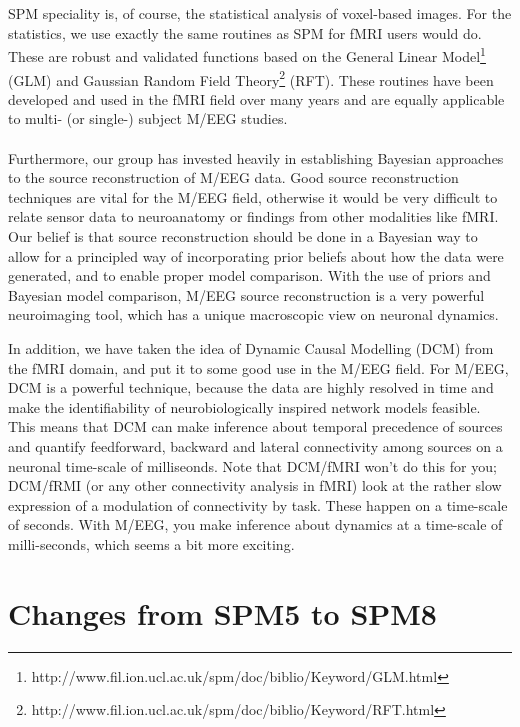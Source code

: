\\
\\
SPM speciality is, of course, the statistical analysis of voxel-based images. For the statistics, we use exactly the same routines as SPM for fMRI users would do. These are robust and validated functions based on the General Linear Model\footnote{http://www.fil.ion.ucl.ac.uk/spm/doc/biblio/Keyword/GLM.html} (GLM) and Gaussian Random Field Theory\footnote{http://www.fil.ion.ucl.ac.uk/spm/doc/biblio/Keyword/RFT.html} (RFT). These routines have been developed and used in the fMRI field over many years and are equally applicable to multi- (or single-) subject M/EEG studies.
\\
\\
Furthermore, our group has invested heavily in establishing Bayesian approaches to the source reconstruction of M/EEG data. Good source reconstruction techniques are vital for the M/EEG field, otherwise it would be very difficult to relate sensor data to neuroanatomy or findings from other modalities like fMRI. Our belief is that source reconstruction should be done in a Bayesian way to allow for a principled way of incorporating prior beliefs about how the data were generated, and to enable proper model comparison. With the use of priors and Bayesian model comparison, M/EEG source reconstruction is a very powerful neuroimaging tool, which has a unique macroscopic view on neuronal dynamics.

In addition, we have taken the idea of Dynamic Causal Modelling (DCM) from the fMRI domain, and put it to some good use in the M/EEG field. For M/EEG, DCM is a powerful technique, because the data are highly resolved in time and make the identifiability of neurobiologically inspired network models feasible. This means that DCM can make inference about temporal precedence of sources and quantify feedforward, backward and lateral connectivity among sources on a neuronal time-scale of milliseonds. Note that DCM/fMRI won't do this for you; DCM/fRMI (or any other connectivity analysis in fMRI) look at the rather slow expression of a modulation of connectivity by task. These happen on a time-scale of seconds. With M/EEG, you make inference about dynamics at a time-scale of milli-seconds, which seems a bit more exciting.

\section{Changes from SPM5 to SPM8}

